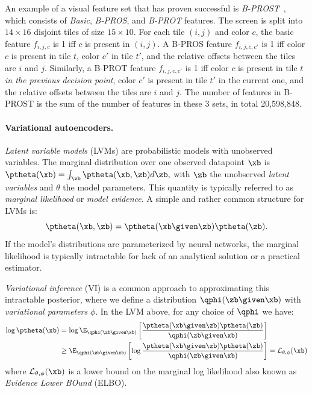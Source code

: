 An example of a visual feature set that has proven successful is \emph{B-PROST}~\cite{liang}, which consists of \emph{Basic}, \emph{B-PROS}, and \emph{B-PROT} features. 
The screen is split into $14 \times 16$ disjoint tiles of size $15 \times 10$. 
For each tile $(i,j)$ and color $c$, the basic feature $f_{i,j,c}$ is 1 iff $c$ is present in $(i,j)$.
A B-PROS feature $f_{i,j,c,c'}$ is 1 iff color $c$ is present in tile $t$, color $c'$ in tile $t'$, and the relative offsets between the tiles are $i$ and $j$.
Similarly, a B-PROT feature $f_{i,j,c,c'}$ is 1 iff color $c$ is present in tile $t$ \emph{in the previous decision point}, color $c'$ is present in tile $t'$ in the current one, and the relative offsets between the tiles are $i$ and $j$.
The number of features in B-PROST is the sum of the number of features in these 3 sets, in total 20,598,848. 


\paragraph{Variational autoencoders.}
\emph{Latent variable models} (LVMs) are probabilistic models with unobserved variables. The marginal distribution over one observed datapoint $\xb$ is
$\ptheta (\xb) = \int_{\zb} \ptheta (\xb, \zb) d \zb,$
with $\zb$ the unobserved \emph{latent variables} and $\theta$ the model parameters. This quantity is typically referred to as \emph{marginal likelihood} or \emph{model evidence}. A simple and rather common structure for LVMs is:
%
%
\begin{equation*}
    \ptheta (\xb, \zb) = \ptheta (\xb \given \zb) \ptheta (\zb).
\end{equation*}
%
If the model's distributions are parameterized by neural networks, the marginal likelihood is typically intractable for lack of an analytical solution or a practical estimator.

\emph{Variational inference} (VI) is a common approach to approximating this intractable posterior, where we define a distribution $\qphi (\zb \given \xb)$ with \emph{variational parameters} $\phi$.
In the LVM above, for any choice of $\qphi$ we have:
%
\begin{align*}
    \log \ptheta(\xb) 
    &= \log \E_{\qphi(\zb \given \xb)} \left[ \frac{\ptheta(\xb \given \zb)\ptheta(\zb)}{\qphi(\zb \given \xb)} \right] \\
    & \geq \E_{\qphi(\zb \given \xb)}  \left[ \log \frac{\ptheta(\xb \given \zb)\ptheta(\zb)}{\qphi(\zb \given \xb)} \right] 
    = \mathcal{L}_{\theta,\phi} (\xb)
\end{align*}
%
where $\mathcal{L}_{\theta,\phi} (\xb)$ is a lower bound on the marginal log likelihood also known as \emph{Evidence Lower BOund} (ELBO).

